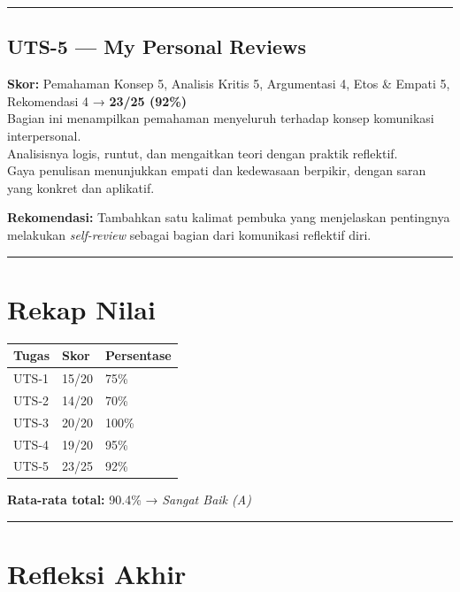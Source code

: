 \documentclass[
  letterpaper,
  DIV=11,
  numbers=noendperiod]{scrreprt}
\begin{document}
\begin{center}\rule{0.5\linewidth}{0.5pt}\end{center}

\subsection{UTS-5 --- My Personal
Reviews}\label{uts-5-my-personal-reviews-1}

\textbf{Skor:} Pemahaman Konsep 5, Analisis Kritis 5, Argumentasi 4,
Etos \& Empati 5, Rekomendasi 4 → \textbf{23/25 (92\%)}\\
Bagian ini menampilkan pemahaman menyeluruh terhadap konsep komunikasi
interpersonal.\\
Analisisnya logis, runtut, dan mengaitkan teori dengan praktik
reflektif.\\
Gaya penulisan menunjukkan empati dan kedewasaan berpikir, dengan saran
yang konkret dan aplikatif.

\textbf{Rekomendasi:} Tambahkan satu kalimat pembuka yang menjelaskan
pentingnya melakukan \emph{self-review} sebagai bagian dari komunikasi
reflektif diri.

\begin{center}\rule{0.5\linewidth}{0.5pt}\end{center}

\section{Rekap Nilai}\label{rekap-nilai}

\begin{longtable}[]{@{}lll@{}}
\toprule\noalign{}
Tugas & Skor & Persentase \\
\midrule\noalign{}
\endhead
\bottomrule\noalign{}
\endlastfoot
UTS-1 & 15/20 & 75\% \\
UTS-2 & 14/20 & 70\% \\
UTS-3 & 20/20 & 100\% \\
UTS-4 & 19/20 & 95\% \\
UTS-5 & 23/25 & 92\% \\
\end{longtable}

\textbf{Rata-rata total:} 90.4\% → \emph{Sangat Baik (A)}

\begin{center}\rule{0.5\linewidth}{0.5pt}\end{center}

\section{Refleksi Akhir}\label{refleksi-akhir-1}
\end{document}
